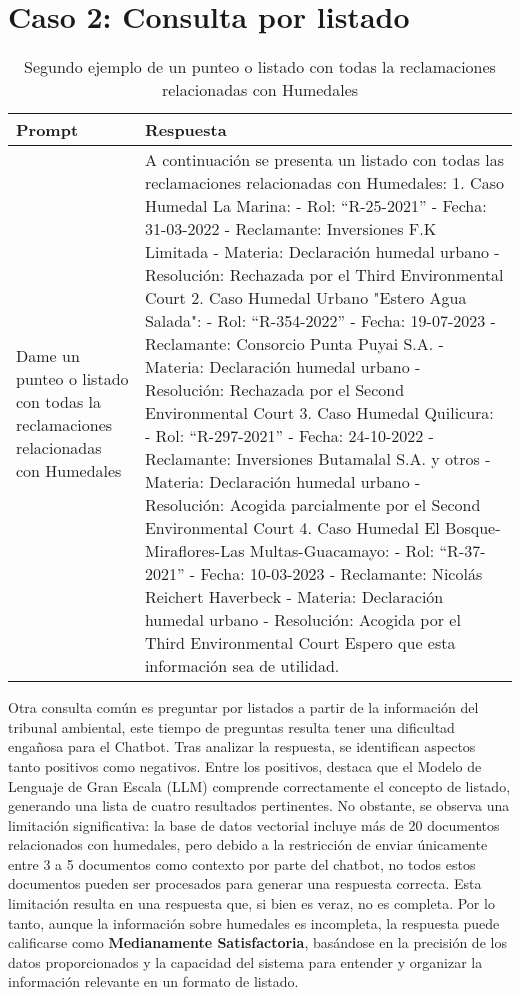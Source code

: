 \section{Caso 2: Consulta por listado}

\begin{table}[ht!]
    \centering
    \caption[Ejemplo: Segundo Prompt]{Segundo ejemplo de un punteo o listado con todas la reclamaciones relacionadas con Humedales}
    \begin{tabular}{p{3cm}p{12cm}}
        \toprule
        \textbf{Prompt} & \textbf{Respuesta} \\
        \hline\hline
        Dame un punteo o listado con todas la reclamaciones relacionadas con Humedales& A continuación se presenta un listado con todas las reclamaciones relacionadas con Humedales: 1. Caso Humedal La Marina: - Rol: ``R-25-2021'' - Fecha: 31-03-2022 - Reclamante: Inversiones F.K Limitada - Materia: Declaración humedal urbano - Resolución: Rechazada por el Third Environmental Court 2. Caso Humedal Urbano "Estero Agua Salada": - Rol: ``R-354-2022'' - Fecha: 19-07-2023 - Reclamante: Consorcio Punta Puyai S.A. - Materia: Declaración humedal urbano - Resolución: Rechazada por el Second Environmental Court 3. Caso Humedal Quilicura: - Rol: ``R-297-2021'' - Fecha: 24-10-2022 - Reclamante: Inversiones Butamalal S.A. y otros - Materia: Declaración humedal urbano - Resolución: Acogida parcialmente por el Second Environmental Court 4. Caso Humedal El Bosque-Miraflores-Las Multas-Guacamayo: - Rol: ``R-37-2021'' - Fecha: 10-03-2023 - Reclamante: Nicolás Reichert Haverbeck - Materia: Declaración humedal urbano - Resolución: Acogida por el Third Environmental Court Espero que esta información sea de utilidad.  \\
        \bottomrule
    \end{tabular}
    \label{tb1:prompt1}
\end{table}

Otra consulta común es preguntar por listados a partir de la información del tribunal ambiental, este tiempo de preguntas resulta tener una dificultad engañosa para el Chatbot.
Tras analizar la respuesta, se identifican aspectos tanto positivos como negativos. Entre los positivos, destaca que el Modelo de Lenguaje de Gran Escala (LLM) 
comprende correctamente el concepto de listado, generando una lista de cuatro resultados pertinentes. No obstante, se observa una limitación significativa: 
la base de datos vectorial incluye más de 20 documentos relacionados con humedales, pero debido a la restricción de enviar únicamente entre 3 a 5 
documentos como contexto por parte del chatbot, no todos estos documentos pueden ser procesados para generar una respuesta correcta. Esta limitación 
resulta en una respuesta que, si bien es veraz, no es completa. Por lo tanto, aunque la información sobre humedales es incompleta, la respuesta puede 
calificarse como \textbf{Medianamente Satisfactoria}, basándose en la precisión de los datos proporcionados y la capacidad del sistema para entender y 
organizar la información relevante en un formato de listado.

